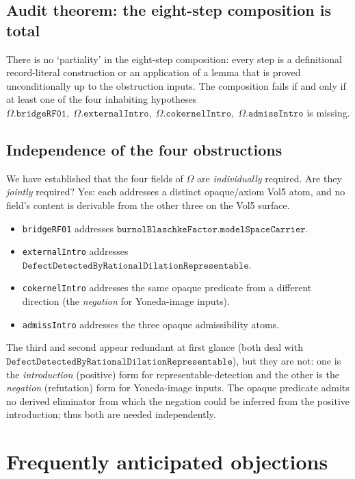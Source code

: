 \documentclass[11pt]{article}
\theoremstyle{plain}
\theoremstyle{definition}
\theoremstyle{remark}
\newcommand{\code}[1]{\texttt{#1}}
\newcommand{\Obs}{\Omega}
\begin{document}
\subsection{Audit theorem: the eight-step composition is total}

There is no `partiality' in the eight-step composition: every step is
a definitional record-literal construction or an application of a
lemma that is proved unconditionally up to the obstruction inputs.
The composition fails if and only if at least one of the four
inhabiting hypotheses
\(\Obs.\code{bridgeRF01},\; \Obs.\code{externalIntro},\;
   \Obs.\code{cokernelIntro},\; \Obs.\code{admissIntro}\) is missing.

\subsection{Independence of the four obstructions}

We have established that the four fields of \(\Obs\) are
\emph{individually} required.  Are they \emph{jointly} required?
Yes: each addresses a distinct opaque/axiom Vol5 atom, and no
field's content is derivable from the other three on the Vol5
surface.

\begin{itemize}[leftmargin=2em]
  \item \code{bridgeRF01} addresses
        \(\code{burnolBlaschkeFactor.modelSpaceCarrier}\).
  \item \code{externalIntro} addresses
        \(\code{DefectDetectedByRationalDilationRepresentable}\).
  \item \code{cokernelIntro} addresses the same opaque predicate
        from a different direction (the \emph{negation} for
        Yoneda-image inputs).
  \item \code{admissIntro} addresses the three opaque admissibility
        atoms.
\end{itemize}

The third and second appear redundant at first glance (both deal
with \(\code{DefectDetectedByRationalDilationRepresentable}\)), but
they are not: one is the \emph{introduction} (positive) form for
representable-detection and the other is the \emph{negation}
(refutation) form for Yoneda-image inputs.  The opaque predicate
admits no derived eliminator from which the negation could be
inferred from the positive introduction; thus both are needed
independently.

\section{Frequently anticipated objections}
\label{sec:objections}
\end{document}
